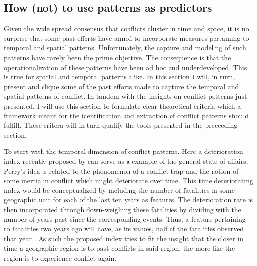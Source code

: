 \documentclass[a4paper]{article}
\begin{document}
\subsection{How (not) to use patterns as predictors}

Given the wide spread consensus that conflicts cluster in time and space, it is no surprise that some past efforts have aimed to incorporate measures pertaining to temporal and spatial patterns. Unfortunately, the capture and modeling of such patterns have rarely been the prime objective. The consequence is that the operationalization of these patterns have been ad hoc and underdeveloped. This is true for spatial and temporal patterns alike. In this section I will, in turn, present and clique some of the past efforts made to capture the temporal and spatial patterns of conflict. In tandem with the insights on conflict patterns just presented, I will use this section to formulate clear theoretical criteria which a framework meant for the identification and extraction of conflict patterns should fulfill. These critera will in turn qualify the tools presented in the proceeding section.\par


To start with the temporal dimension of conflict patterns. Here a deterioration index recently proposed by \cite{perry_2013} can serve as a example of the general state of affairs. Perry's idea is related to the phenomenon of a conflict trap and the notion of some inertia in conflict which might deteriorate over time. This time deteriorating index would be conceptualized by including the number of fatalities in some geographic unit for each of the last ten years as features. The deterioration rate is then incorporated through down-weighing these fatalities by dividing with the number of years past since the corresponding events. Thus, a feature pertaining to fatalities two years ago will have, as its values, half of the fatalities observed that year \cite[14]{perry_2013}. As such the proposed index tries to fit the insight that the closer in time a geographic region is to past conflicts in said region, the more like the region is to experience conflict again.\par
\end{document}

